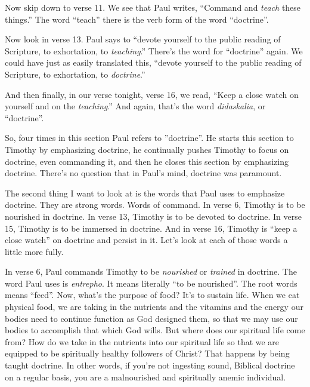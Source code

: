 \documentclass[letterpaper, 12pt]{article}
\begin{document}
    Now skip down to verse 11. We see that Paul writes, ``Command and
    \emph{teach} these things.'' The word ``teach'' there is the verb
    form of the word ``doctrine''. 

    Now look in verse 13. Paul says to ``devote yourself to the public
    reading of Scripture, to exhortation, to \emph{teaching}.'' There's
    the word for ``doctrine'' again. We could have just as easily
    translated this, ``devote yourself to the public reading of
    Scripture, to exhortation, to \emph{doctrine}.''

    And then finally, in our verse tonight, verse 16, we read, ``Keep a
    close watch on yourself and on the \emph{teaching}.'' And again,
    that's the word \emph{didaskalia}, or ``doctrine''. 

    So, four times in this section Paul refers to ''doctrine''. He
    starts this section to Timothy by emphasizing doctrine, he
    continually pushes Timothy to focus on doctrine, even commanding it,
    and then he closes this section by emphasizing doctrine. There's no
    question that in Paul's mind, doctrine was paramount.

    The second thing I want to look at is the words that Paul uses to
    emphasize doctrine. They are strong words. Words of command. In
    verse 6, Timothy is to be nourished in doctrine. In verse 13,
    Timothy is to be devoted to doctrine. In verse 15, Timothy is to be
    immersed in doctrine. And in verse 16, Timothy is ``keep a close
    watch'' on doctrine and persist in it.  Let's look at each of those
    words a little more fully.

    In verse 6, Paul commands Timothy to be \emph{nourished} or
    \emph{trained} in doctrine.  The word Paul uses is \emph{entrepho}.
    It means literally ``to be nourished''. The root words means
    ``feed''. Now, what's the purpose of food? It's to sustain life.
    When we eat physical food, we are taking in the nutrients and the
    vitamins and the energy our bodies need to continue function as God
    designed them, so that we may use our bodies to accomplish that
    which God wills. But where does our spiritual life come from? How do
    we take in the nutrients into our spiritual life so that we are
    equipped to be spiritually healthy followers of Christ? That happens
    by being taught doctrine. In other words, if you're not ingesting
    sound, Biblical doctrine on a regular basis, you are a malnourished
    and spiritually anemic individual.
\end{document}
